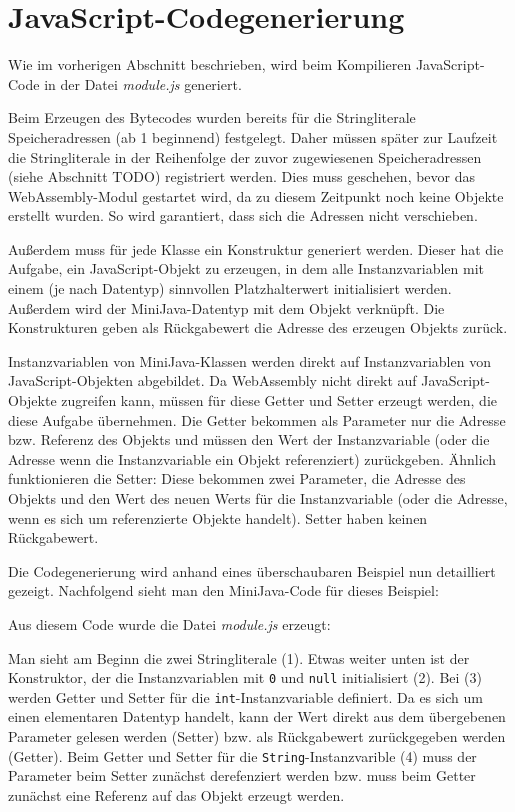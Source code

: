 \section{JavaScript-Codegenerierung}

Wie im vorherigen Abschnitt beschrieben, wird beim Kompilieren JavaScript-Code in der Datei \emph{module.js} generiert.

Beim Erzeugen des Bytecodes wurden bereits für die Stringliterale Speicheradressen (ab 1 beginnend) festgelegt. Daher müssen später zur Laufzeit die Stringliterale in der Reihenfolge der zuvor zugewiesenen Speicheradressen (siehe Abschnitt TODO) registriert werden. Dies muss geschehen, bevor das WebAssembly-Modul gestartet wird, da zu diesem Zeitpunkt noch keine Objekte erstellt wurden. So wird garantiert, dass sich die Adressen nicht verschieben.

Außerdem muss für jede Klasse ein Konstruktur generiert werden. Dieser hat die Aufgabe, ein JavaScript-Objekt zu erzeugen, in dem alle Instanzvariablen mit einem (je nach Datentyp) sinnvollen Platzhalterwert initialisiert werden. Außerdem wird der MiniJava-Datentyp mit dem Objekt verknüpft. Die Konstrukturen geben als Rückgabewert die Adresse des erzeugen Objekts zurück.

Instanzvariablen von MiniJava-Klassen werden direkt auf Instanzvariablen von Java\-Script-Objekten abgebildet. Da WebAssembly nicht direkt auf JavaScript-Objekte zugreifen kann, müssen für diese Getter und Setter erzeugt werden, die diese Aufgabe übernehmen. Die Getter bekommen als Parameter nur die Adresse bzw. Referenz des Objekts und müssen den Wert der Instanzvariable (oder die Adresse wenn die Instanzvariable ein Objekt referenziert) zurückgeben. Ähnlich funktionieren die Setter: Diese bekommen zwei Parameter, die Adresse des Objekts und den Wert des neuen Werts für die Instanzvariable (oder die Adresse, wenn es sich um referenzierte Objekte handelt). Setter haben keinen Rückgabewert.

Die Codegenerierung wird anhand eines überschaubaren Beispiel nun detailliert gezeigt. Nachfolgend sieht man den MiniJava-Code für dieses Beispiel:



Aus diesem Code wurde die Datei \emph{module.js} erzeugt:



Man sieht am Beginn die zwei Stringliterale (1). Etwas weiter unten ist der Konstruktor, der die Instanzvariablen mit \lstinline{0} und \lstinline{null} initialisiert (2). Bei (3) werden Getter und Setter für die \lstinline{int}-Instanzvariable definiert. Da es sich um einen elementaren Datentyp handelt, kann der Wert direkt aus dem übergebenen Parameter gelesen werden (Setter) bzw. als Rückgabewert zurückgegeben werden (Getter). Beim Getter und Setter für die \lstinline{String}-Instanzvarible (4) muss der Parameter beim Setter zunächst derefenziert werden bzw. muss beim Getter zunächst eine Referenz auf das Objekt erzeugt werden.

